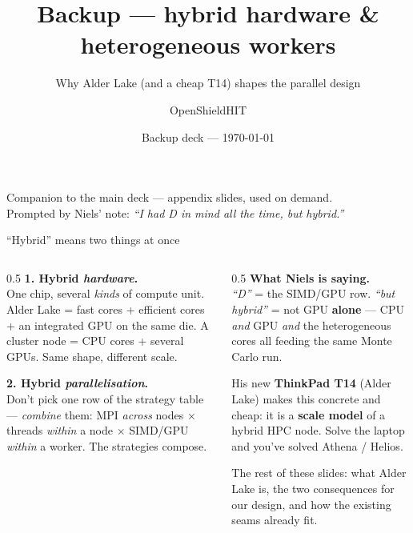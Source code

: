 \documentclass[aspectratio=169,10pt]{beamer}
\title{Backup — hybrid hardware \& heterogeneous workers}
\subtitle{Why Alder Lake (and a cheap T14) shapes the parallel design}
\author{OpenShieldHIT}
\date{Backup deck — \today}
\begin{document}
\begin{frame}[plain]
  \titlepage
  \begin{center}\scriptsize\color{oshGrey}
    Companion to the main deck — appendix slides, used on demand.\\
    Prompted by Niels' note: \emph{``I had D in mind all the time, but hybrid.''}
  \end{center}
\end{frame}

\begin{frame}{``Hybrid'' means two things at once}
  \begin{columns}[T]
    \begin{column}{0.5\textwidth}
      \small
      \textbf{1. Hybrid \emph{hardware}.}\\
      One chip, several \emph{kinds} of compute unit. Alder Lake =
      fast cores + efficient cores + an integrated GPU on the same die. A
      cluster node = CPU cores + several GPUs. Same shape, different scale.
      \medskip

      \textbf{2. Hybrid \emph{parallelisation}.}\\
      Don't pick one row of the strategy table — \emph{combine} them:
      MPI \emph{across} nodes $\times$ threads \emph{within} a node $\times$
      SIMD/GPU \emph{within} a worker. The strategies compose.
    \end{column}
    \begin{column}{0.5\textwidth}
      \small
      \textbf{What Niels is saying.}\\
      \emph{``D''} = the SIMD/GPU row. \emph{``but hybrid''} = not GPU
      \textbf{alone} — CPU \emph{and} GPU \emph{and} the heterogeneous cores all
      feeding the same Monte Carlo run.
      \medskip

      His new \textbf{ThinkPad T14} (Alder Lake) makes this concrete and cheap:
      it is a \textbf{scale model} of a hybrid HPC node. Solve the laptop and
      you've solved Athena / Helios.
      \medskip

      \footnotesize\color{oshGrey}
      The rest of these slides: what Alder Lake is, the two consequences for our
      design, and how the existing seams already fit.
    \end{column}
  \end{columns}
\end{frame}
\end{document}
